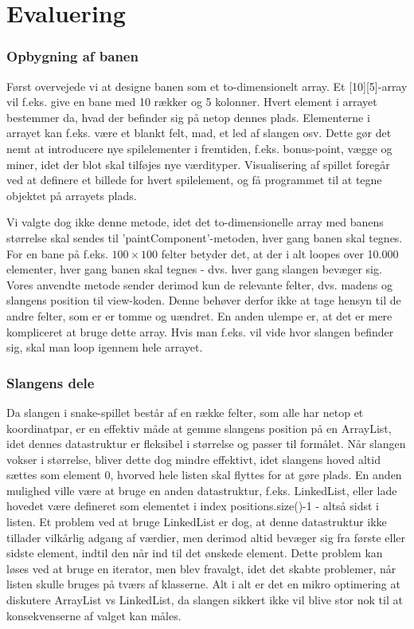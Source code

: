 \section{Evaluering}

\subsubsection{Opbygning af banen}
Først overvejede vi at designe banen som et to-dimensionelt array. Et [10][5]-array vil f.eks. give en bane med 10 rækker og 5 kolonner. Hvert element i arrayet bestemmer da, hvad der befinder sig på netop dennes plads. Elementerne i arrayet kan f.eks. være et blankt felt, mad, et led af slangen osv. Dette gør det nemt at introducere nye spilelementer i fremtiden, f.eks. bonus-point, vægge og miner, idet der blot skal tilføjes nye værdityper. Visualisering af spillet foregår ved at definere et billede for hvert spilelement, og få programmet til at tegne objektet på arrayets plads.

Vi valgte dog ikke denne metode, idet det to-dimensionelle array med banens størrelse skal sendes til 'paintComponent'-metoden, hver gang banen skal tegnes. For en bane på f.eks. $100\times 100$ felter betyder det, at der i alt loopes over 10.000 elementer, hver gang banen skal tegnes - dvs. hver gang slangen bevæger sig. Vores anvendte metode sender derimod kun de relevante felter, dvs. madens og slangens position til view-koden. Denne behøver derfor ikke at tage hensyn til de andre felter, som er er tomme og uændret. En anden ulempe er, at det er mere kompliceret at bruge dette array. Hvis man f.eks. vil vide hvor slangen befinder sig, skal man loop igennem hele arrayet.

\subsubsection{Slangens dele}
Da slangen i snake-spillet består af en række felter, som alle har netop et koordinatpar, er en effektiv måde at gemme slangens position på en ArrayList, idet dennes datastruktur er fleksibel i størrelse og passer til formålet. Når slangen vokser i størrelse, bliver dette dog mindre effektivt, idet slangens hoved altid sættes som element 0, hvorved hele listen skal flyttes for at gøre plads. En anden mulighed ville være at bruge en anden datastruktur, f.eks. LinkedList, eller lade hovedet være defineret som elementet i index positions.size()-1 - altså sidst i listen. Et problem ved at bruge LinkedList er dog, at denne datastruktur ikke tillader vilkårlig adgang af værdier, men derimod altid bevæger sig fra første eller sidste element, indtil den når ind til det ønskede element. Dette problem kan løses ved at bruge en iterator, men blev fravalgt, idet det skabte problemer, når listen skulle bruges på tværs af klasserne. Alt i alt er det en mikro optimering at diskutere ArrayList vs LinkedList, da slangen sikkert ikke vil blive stor nok til at konsekvenserne af valget kan måles.

